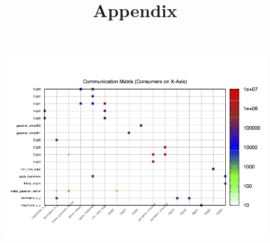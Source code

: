\documentclass[10pt,final,journal]{IEEEtran}
\title{Appendix}
\begin{document}
\maketitle


\begin{figure}[h!]
    \includegraphics[width=\linewidth]{memory_profile}
\end{figure}
\end{document}
